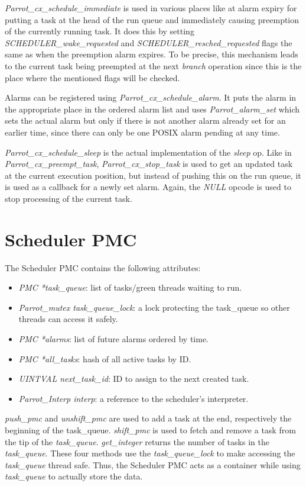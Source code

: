 \documentclass[bachelor,english]{hgbthesis}
\begin{document}
\textit{Parrot\_cx\_schedule\_immediate} is used in various places like at alarm expiry for putting a task at the head of the run queue and immediately causing preemption of the currently running task. It does this by setting \textit{SCHEDULER\_wake\_requested} and \textit{SCHEDULER\_resched\_requested} flags the same as when the preemption alarm expires. To be precise, this mechanism leads to the current task being preempted at the next \textit{branch} operation since this is the place where the mentioned flags will be checked.

Alarms can be registered using \textit{Parrot\_cx\_schedule\_alarm}. It puts the alarm in the appropriate place in the ordered alarm list and uses \textit{Parrot\_alarm\_set} which sets the actual alarm but only if there is not another alarm already set for an earlier time, since there can only be one POSIX alarm pending at any time.

\textit{Parrot\_cx\_schedule\_sleep} is the actual implementation of the \textit{sleep} op. Like in \textit{Parrot\_cx\_preempt\_task}, \textit{Parrot\_cx\_stop\_task} is used to get an updated task at the current execution position, but instead of pushing this on the run queue, it is used as a callback for a newly set alarm. Again, the \textit{NULL} opcode is used to stop processing of the current task.

\section{Scheduler PMC}

The Scheduler PMC contains the following attributes:
%
\begin{itemize}
\item \textit{PMC *task\_queue}: list of tasks/green threads waiting to run.
\item \textit{Parrot\_mutex task\_queue\_lock}: a lock protecting the task\_queue so other threads can access it safely.
\item \textit{PMC *alarms}: list of future alarms ordered by time.
\item \textit{PMC *all\_tasks}: hash of all active tasks by ID.
\item \textit{UINTVAL next\_task\_id}: ID to assign to the next created task.
\item \textit{Parrot\_Interp interp}: a reference to the scheduler's interpreter.
\end{itemize}

\textit{push\_pmc} and \textit{unshift\_pmc} are used to add a task at the end, respectively the beginning of the task\_queue. \textit{shift\_pmc} is used to fetch and remove a task from the tip of the \textit{task\_queue}. \textit{get\_integer} returns the number of tasks in the \textit{task\_queue}. These four methods use the \textit{task\_queue\_lock} to make accessing the \textit{task\_queue} thread safe. Thus, the Scheduler PMC acts as a container while using \textit{task\_queue} to actually store the data.
\end{document}
